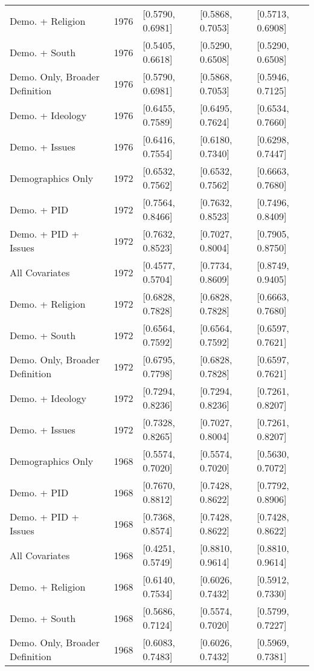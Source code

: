 \begin{longtable}{lrlll}
  Demo. + Religion & 1976 & [0.5790, 0.6981] & [0.5868, 0.7053] & [0.5713, 0.6908] \\ 
  Demo. + South & 1976 & [0.5405, 0.6618] & [0.5290, 0.6508] & [0.5290, 0.6508] \\ 
  Demo. Only, Broader Definition & 1976 & [0.5790, 0.6981] & [0.5868, 0.7053] & [0.5946, 0.7125] \\ 
  Demo. + Ideology & 1976 & [0.6455, 0.7589] & [0.6495, 0.7624] & [0.6534, 0.7660] \\ 
  Demo. + Issues & 1976 & [0.6416, 0.7554] & [0.6180, 0.7340] & [0.6298, 0.7447] \\ 
  Demographics Only & 1972 & [0.6532, 0.7562] & [0.6532, 0.7562] & [0.6663, 0.7680] \\ 
  Demo. + PID & 1972 & [0.7564, 0.8466] & [0.7632, 0.8523] & [0.7496, 0.8409] \\ 
  Demo. + PID + Issues & 1972 & [0.7632, 0.8523] & [0.7027, 0.8004] & [0.7905, 0.8750] \\ 
  All Covariates & 1972 & [0.4577, 0.5704] & [0.7734, 0.8609] & [0.8749, 0.9405] \\ 
  Demo. + Religion & 1972 & [0.6828, 0.7828] & [0.6828, 0.7828] & [0.6663, 0.7680] \\ 
  Demo. + South & 1972 & [0.6564, 0.7592] & [0.6564, 0.7592] & [0.6597, 0.7621] \\ 
  Demo. Only, Broader Definition & 1972 & [0.6795, 0.7798] & [0.6828, 0.7828] & [0.6597, 0.7621] \\ 
  Demo. + Ideology & 1972 & [0.7294, 0.8236] & [0.7294, 0.8236] & [0.7261, 0.8207] \\ 
  Demo. + Issues & 1972 & [0.7328, 0.8265] & [0.7027, 0.8004] & [0.7261, 0.8207] \\ 
  Demographics Only & 1968 & [0.5574, 0.7020] & [0.5574, 0.7020] & [0.5630, 0.7072] \\ 
  Demo. + PID & 1968 & [0.7670, 0.8812] & [0.7428, 0.8622] & [0.7792, 0.8906] \\ 
  Demo. + PID + Issues & 1968 & [0.7368, 0.8574] & [0.7428, 0.8622] & [0.7428, 0.8622] \\ 
  All Covariates & 1968 & [0.4251, 0.5749] & [0.8810, 0.9614] & [0.8810, 0.9614] \\ 
  Demo. + Religion & 1968 & [0.6140, 0.7534] & [0.6026, 0.7432] & [0.5912, 0.7330] \\ 
  Demo. + South & 1968 & [0.5686, 0.7124] & [0.5574, 0.7020] & [0.5799, 0.7227] \\ 
  Demo. Only, Broader Definition & 1968 & [0.6083, 0.7483] & [0.6026, 0.7432] & [0.5969, 0.7381] \\ 

\end{longtable}
